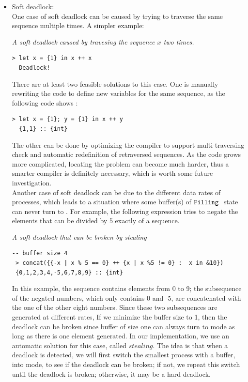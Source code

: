\begin{itemize}

\item Soft deadlock: \\

One case of soft deadlock can be caused by trying to traverse the same sequence multiple times. 
A simpler example:

\begin{example} \emph{A soft deadlock caused by travesing the sequence $x$ two times.} \label{eg:deadlock1}
\end{example}
	\begin{lstlisting}[style=nesl-style]
  > let x = {1} in x ++ x
  Deadlock!
\end{lstlisting}

There are at least two feasible solutions to this case.
One is manually rewriting the code to define new variables for the same sequence, as the following code shows :\\

\begin{lstlisting}[style=nesl-style]
  > let x = {1}; y = {1} in x ++ y
  {1,1} :: {int}
\end{lstlisting}


The other can be done by optimizing the compiler to support multi-traversing check and automatic 
redefinition of retraversed sequences. 
As the code grows more complicated, locating the problem can become much harder, thus a smarter compiler is definitely necessary, which is worth some future investigation.\\


Another case of soft deadlock can be due to the different data rates of processes, which leads to a situation where some buffer(s) of $\texttt{Filling} \ $ state can never turn to \draining. 
For example, the following expression tries to negate the elements that can be divided by 5 exactly of a sequence.
\begin{example}\emph{ A soft deadlock that can be broken by stealing}
\end{example}
\begin{lstlisting}[style=nesl-style]
  -- buffer size 4 
 > concat({{-x | x % 5 == 0} ++ {x | x %5 != 0} :  x in &10})
 {0,1,2,3,4,-5,6,7,8,9} :: {int}
\end{lstlisting}

In this example, the sequence contains elements from 0 to 9; the subsequence of the negated numbers, which only contains 0 and -5, are concatenated with the one of the other eight numbers. Since these two subsequences are generated at different rates, 
If we minimize the buffer size to 1, then the deadlock can be broken since buffer of size one can always turn to \draining mode as long as there is one element generated. 
In our implementation, we use an automatic solution for this case, called $stealing$. 
The idea is that when a deadlock is detected, we will first switch the smallest process with a \filling buffer, into \draining mode, to see if the deadlock can be broken; if not, we repeat this switch until the deadlock is broken; otherwise, it may be a hard deadlock.


\end{itemize}
